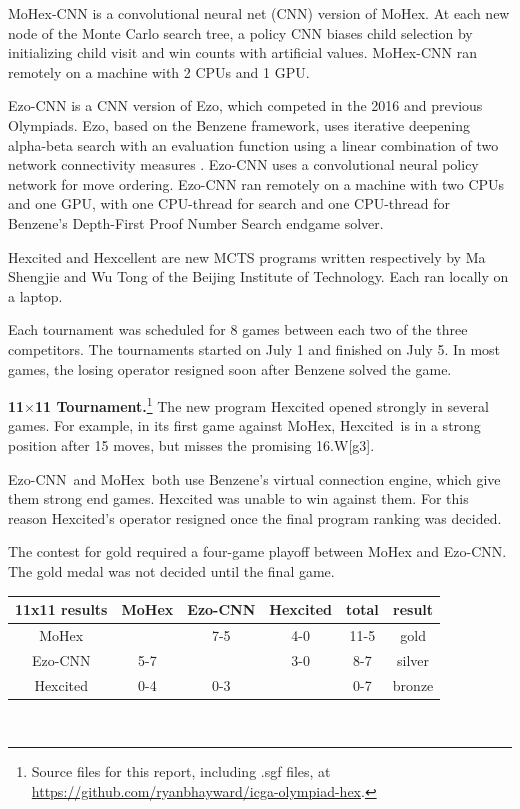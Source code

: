 \documentclass{icga}
\def\Eo{\mbox{\sc Ezo}}
\def\Ec{\mbox{\sc Ezo-CNN}}
\def\Hite{\mbox{\sc Hexcited}}
\def\Hent{\mbox{\sc Hexcellent}}
\def\Mx{\mbox{\sc MoHex}}
\def\Mc{\mbox{\sc MoHex-CNN}}
\begin{document}
\Mc{} is a convolutional neural net (CNN) version of \Mx{}. 
At each new node of the Monte Carlo search tree, 
a policy CNN biases child selection by
initializing child visit and win counts with artificial values.
\Mc{} ran remotely on a machine with 2 CPUs and 1 GPU.

\Ec{} is a CNN version of \Eo{}, which competed
in the 2016 and previous Olympiads.
\Eo{}, based on the Benzene framework, 
uses iterative deepening alpha-beta search 
with an evaluation function using a linear combination of
two network connectivity measures .
\Ec{} uses a convolutional neural policy network
for move ordering.
\Ec{} ran remotely on a machine
with two CPUs and one GPU,
with one CPU-thread for search and one CPU-thread for
Benzene's Depth-First Proof Number Search endgame solver.

\Hite{} and \Hent{} are new MCTS programs written 
respectively by Ma Shengjie and Wu Tong
of the Beijing Institute of Technology.
Each ran locally on a laptop.

Each tournament was scheduled for 8 games between
each two of the three competitors.
The tournaments started on July 1 and finished on July 5.
In most games, the losing operator resigned
soon after Benzene solved the game.

{\large\bf 11$\times$11 Tournament.}\footnote{Source files for this report, including .sgf files, at \url{https://github.com/ryanbhayward/icga-olympiad-hex}.}
The new program \Hite{} opened strongly in several games.
For example, in its first game against \Mx, \Hite\ is in a strong
position after 15 moves, but misses the promising 16.W[g3].

\Ec\ and \Mx\ both use Benzene's virtual connection engine,
which give them strong end games. \Hite{} was unable to win
against them. For this reason \Hite's operator
resigned once the final program ranking was decided.

The contest for gold required a four-game playoff between \Mx{} and \Ec{}.
The gold medal was not decided until the final game.

\hfill\begin{tabular}{|c|c|c|c|c|c|}
\hline 11x11 results &\Mx{} &\Ec{}  & \Hite{}  & total & result \\ 
\hline \Mx{}         &      &  7-5  &  4-0   & 11-5  &  gold \\
\hline \Ec{}         &  5-7 &       &  3-0   & 8-7   &  silver \\
\hline \Hite{}       &  0-4 &  0-3  &        & 0-7   &  bronze \\
\hline
\end{tabular}\hfill~
\end{document}
